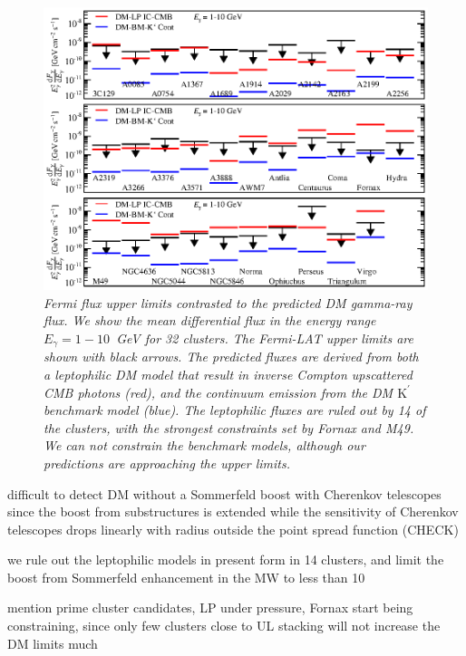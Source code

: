 \documentclass[10pt,aps,pra,reprint,amsmath,amsfonts,amssymb,showpacs]{revtex4-1}
\newcommand{\rmn}{\mathrm}
\newcommand{\Kp}{\rmn{K}^\prime}
\begin{document}
\begin{figure}
\begin{minipage}{2.0\columnwidth}
  \includegraphics[width=0.99\columnwidth]{figures/Fermi.comp.DM.eps}
  \caption{\it Fermi flux upper limits contrasted to the predicted DM
    gamma-ray flux. We show the mean differential flux in the energy
    range $E_\gamma=1-10$~GeV for 32 clusters. The Fermi-LAT upper
    limits are shown with black arrows. The predicted fluxes are
    derived from both a leptophilic DM model that result in inverse
    Compton upscattered CMB photons (red), and the continuum emission
    from the DM $\Kp$ benchmark model (blue). The leptophilic fluxes
    are ruled out by 14 of the clusters, with the strongest
    constraints set by Fornax and M49. We can not constrain the
    benchmark models, although our predictions are approaching the
    upper limits.}
 \label{fig14}
\end{minipage}
\end{figure}
 difficult to detect DM without a Sommerfeld boost with Cherenkov
 telescopes since the boost from substructures is extended while the
 sensitivity of Cherenkov telescopes drops linearly with radius
 outside the point spread function (CHECK)

we rule out the leptophilic models in present form in 14 clusters,
 and limit the boost from Sommerfeld enhancement in the MW to less
 than 10

mention prime cluster candidates, LP under pressure, Fornax start
being constraining, since only few clusters close to UL stacking will
not increase the DM limits much
\end{document}
